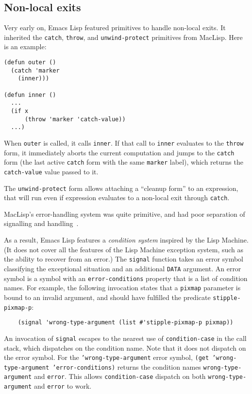 \documentclass[format=acmsmall, review]{acmart}
\newcommand \Elisp {Emacs Lisp}
\begin{document}
\subsection{Non-local exits}
\label{sec:non-local-exits}

Very early on, \Elisp{} featured primitives to handle
non-local exits.  It inherited the \texttt{catch}, \texttt{throw}, and
\texttt{unwind-protect} primitives from MacLisp.  Here is an example:
%
\begin{verbatim}
(defun outer ()
  (catch 'marker
    (inner)))

(defun inner ()
  ...
  (if x
      (throw 'marker 'catch-value))
  ...)
\end{verbatim}
%
When \texttt{outer} is called, it calls \texttt{inner}.  If that call
to \texttt{inner} evaluates to the \texttt{throw} form, it immediately
aborts the current computation and jumps to the \texttt{catch} form
(the last active \texttt{catch} form with the same \texttt{marker}
label), which returns the \texttt{catch-value} value passed to it.

The \texttt{unwind-protect} form allows attaching a ``cleanup form''
to an expression, that will run even if expression evaluates to a
non-local exit through \texttt{catch}.

MacLisp's error-handling system was quite primitive, and had poor separation
of signalling and handling~\cite{Pitman2001}.

As a result, \Elisp{} features
a \emph{condition system} inspired by the Lisp Machine.  (It does
not cover all the features of the Lisp Machine exception system, such as the ability
to recover from an error.)
The \texttt{signal} function takes an error symbol classifying the
exceptional situation and an additional \texttt{DATA} argument.  An error
symbol is a symbol with an \texttt{error-conditions} property that is a list
of condition names.  For example, the following invocation states that
a \texttt{pixmap} parameter is bound to an invalid argument, and
should have fulfilled the predicate \texttt{stipple-pixmap-p}:
\begin{verbatim}
    (signal 'wrong-type-argument (list #'stipple-pixmap-p pixmap))
\end{verbatim}
An invocation of \texttt{signal} escapes to the nearest use of
\texttt{condition-case} in the call stack, which dispatches on the
condition name.  Note that it does not dispatch on the error symbol.
For the \texttt{'wrong-type-argument} error symbol, \texttt{(get
  'wrong-type-argument 'error-conditions)} returns the condition names
\texttt{wrong-type-argument} and \texttt{error}.  This allows
\texttt{condition-case} dispatch on both \texttt{wrong-type-argument}
and \texttt{error} to work.
\end{document}
